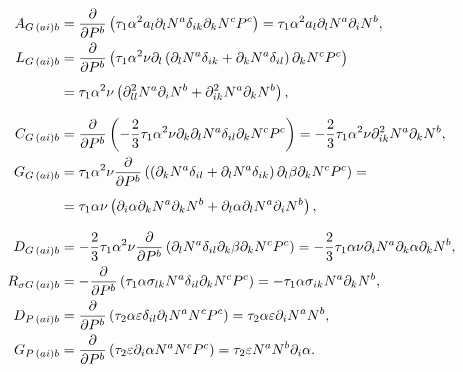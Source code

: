 \begin{align}
  A_{G\, (ai)b}        & = \frac{\partial }{\partial P^b} \left( \tau_1 \alpha^2 a_l \partial_l N^a \delta_{ik} \partial_k N^c P^c \right) = \tau_1 \alpha^2 a_l \partial_l N^a \partial_i N^b, \label{eq:AGLHSStabilizationTerm}                                                              \\
  L_{G\, (ai)b}        & = \frac{\partial }{\partial P^b} \left( \tau_1 \alpha^2 \nu \partial_l \left( \partial_l N^a \delta_{ik} + \partial_k N^a \delta_{il} \right) \partial_k N^c P^c \right) \notag                                                                                       \\
                       & =\vphantom{\frac{\partial }{\partial U_j^b}} \tau_1 \alpha^2 \nu \left( \partial^2_{ll} N^a \partial_i N^b + \partial^2_{ik} N^a \partial_k N^b \right), \label{eq:LGLHSStabilizationTerm}                                                                            \\
  C_{G\, (ai)b}        & = \frac{\partial }{\partial P^b} \left( - \frac{2}{3} \tau_1 \alpha^2 \nu \partial_k \partial_l N^a \delta_{il} \partial_k N^c P^c \right) = - \frac{2}{3} \tau_1 \alpha^2 \nu \partial^2_{ik} N^a \partial_k N^b, \label{eq:CGLHSStabilizationTerm}                  \\
  G_{G\, (ai)b}        & = \tau_1 \alpha^2 \nu \frac{\partial }{\partial P^b} \left( \left( \partial_k N^a \delta_{il} + \partial_l N^a \delta_{ik}\right) \partial_l \beta \partial_k N^c P^c \right) = \notag                                                                                \\
                       & =\vphantom{\frac{\partial }{\partial U_j^b}} \tau_1 \alpha \nu \left( \partial_i \alpha \partial_k N^a \partial_k N^b + \partial_l \alpha \partial_l N^a \partial_i N^b \right), \label{eq:GGLHSStabilizationTerm}                                                    \\
  D_{G\, (ai)b}        & = - \frac{2}{3} \tau_1 \alpha^2 \nu \frac{\partial }{\partial P^b} \left( \partial_l N^a \delta_{il} \partial_k \beta \partial_k N^c P^c \right) = - \frac{2}{3} \tau_1 \alpha \nu \partial_i N^a \partial_k \alpha \partial_k N^b, \label{eq:DGLHSStabilizationTerm} \\
  R_{\sigma G\, (ai)b} & = - \frac{\partial }{\partial P^b} \left( \tau_1 \alpha \sigma_{lk} N^a \delta_{il} \partial_k N^c P^c \right) = - \tau_1 \alpha \sigma_{ik} N^a \partial_k N^b, \label{eq:RGLHSStabilizationTerm}                                                                    \\
  D_{P\, (ai)b}        & = \frac{\partial }{\partial P^b} \left( \tau_2 \alpha \varepsilon \delta_{il} \partial_l N^a N^c P^c \right) = \tau_2 \alpha \varepsilon \partial_i N^a N^b, \label{eq:DPLHSStabilizationTerm}                                                                        \\
  G_{P\, (ai)b}        & = \frac{\partial }{\partial P^b} \left( \tau_2 \varepsilon \partial_i \alpha N^a N^c P^c \right) = \tau_2 \varepsilon N^a N^b \partial_i \alpha. \label{eq:GPLHSStabilizationTerm}
\end{align}

